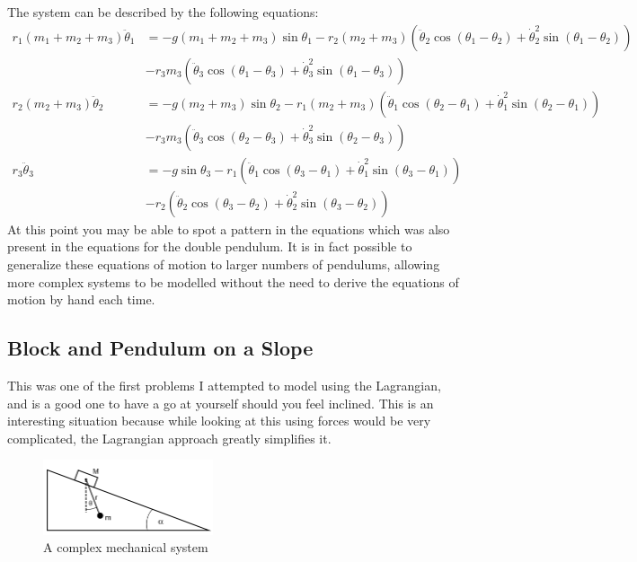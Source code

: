 \documentclass{article}
\begin{document}
The system can be described by the following equations:
\begin{align*}
r_{1}(m_{1} + m_{2} + m_{3}) \ddot{\theta}_{1} &= -g (m_{1} + m_{2} + m_{3}) \sin{\theta_{1}} - r_{2} (m_{2} + m_{3}) \left(\ddot{\theta}_{2} \cos{(\theta_{1} - \theta_{2})} + \dot{\theta}_2^2 \sin{(\theta_{1} - \theta_{2})}\right) \\ &- r_{3} m_{3} \left(\ddot{\theta}_{3} \cos{(\theta_{1} - \theta_{3})} + \dot{\theta}_3^2 \sin{(\theta_{1} - \theta_{3})}\right) \\
r_{2}(m_{2} + m_{3}) \ddot{\theta}_{2} &= -g (m_{2} + m_{3}) \sin{\theta_{2}} - r_{1} (m_{2} + m_{3}) \left(\ddot{\theta}_{1} \cos{(\theta_{2} - \theta_{1})} + \dot{\theta}_1^2 \sin{(\theta_{2} - \theta_{1})}\right) \\ &- r_{3} m_{3} \left(\ddot{\theta}_{3} \cos{(\theta_{2} - \theta_{3})} + \dot{\theta}_3^2 \sin{(\theta_{2} - \theta_{3})}\right) \\
r_{3} \ddot{\theta}_{3} &= -g \sin{\theta_{3}} - r_{1} \left(\ddot{\theta}_{1} \cos{(\theta_{3} - \theta_{1})} + \dot{\theta}_1^2 \sin{(\theta_{3} - \theta_{1})}\right) \\ &- r_{2} \left(\ddot{\theta}_{2} \cos{(\theta_{3} - \theta_{2})} + \dot{\theta}_2^2 \sin{(\theta_{3} - \theta_{2})}\right)
\end{align*}
At this point you may be able to spot a pattern in the equations which was also present in the equations for the double pendulum. It is in fact possible to generalize these equations of motion to larger numbers of pendulums, allowing more complex systems to be modelled without the need to derive the equations of motion by hand each time.

\subsection{Block and Pendulum on a Slope}

This was one of the first problems I attempted to model using the Lagrangian, and is a good one to have a go at yourself should you feel inclined. This is an interesting situation because while looking at this using forces would be very complicated, the Lagrangian approach greatly simplifies it.

\begin{figure}[h!]
\centering
\includegraphics[width=5cm]{Lagrangian_Block_On_Slope.jpg}
\caption{A complex mechanical system}
\end{figure}
\end{document}
